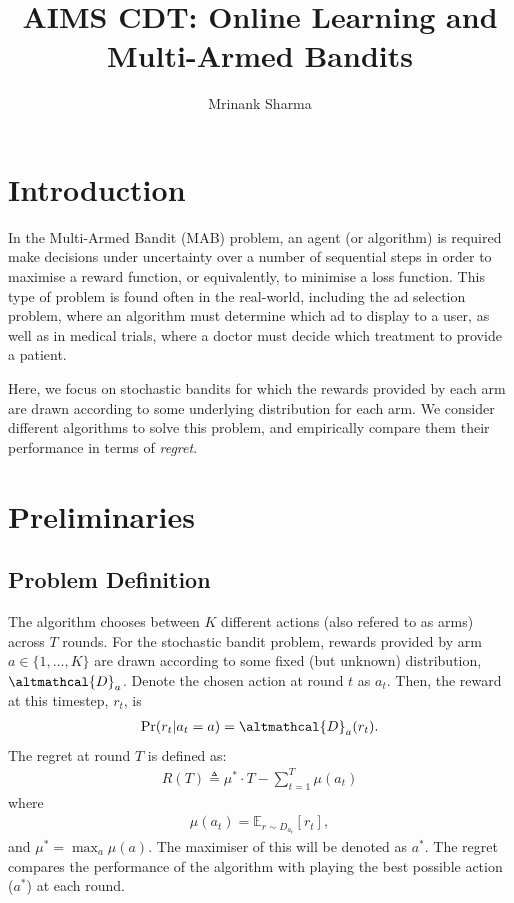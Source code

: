 \documentclass[a4paper]{article}
\title{\vspace{-3cm}AIMS CDT: Online Learning and Multi-Armed Bandits}
\author{Mrinank Sharma}
\date{}
\begin{document}
	\maketitle
	
	\section{Introduction}
	In the Multi-Armed Bandit (MAB) problem, an agent (or algorithm) is required make decisions under uncertainty over a number of sequential steps in order to maximise a reward function, or equivalently, to minimise a loss function. This type of problem is found often in the real-world, including the ad selection problem, where an algorithm must determine which ad to display to a user, as well as in medical trials, where a doctor must decide which treatment to provide a patient.
	
	Here, we focus on stochastic bandits for which the rewards provided by each arm are drawn according to some underlying distribution for each arm. We consider different algorithms to solve this problem, and empirically compare them their performance in terms of \emph{regret}. 
	
	\section{Preliminaries}
	\subsection{Problem Definition}
	The algorithm chooses between $K$ different actions (also refered to as arms) across $T$ rounds. For the stochastic bandit problem, rewards provided by arm $a \in  \lbrace 1, \ldots, K \rbrace$ are drawn according to some fixed (but unknown) distribution, $\altmathcal{D}_a$. Denote the chosen action at round $t$ as $a_t$. Then, the reward at this timestep, $r_t$, is
	\begin{align}
	\text{Pr}(r_t | a_t = a) = \altmathcal{D}_a(r_t).
	\end{align}
	The regret at round $T$ is defined as:
	\begin{align}
	R(T) \triangleq \mu^* \cdot T - \sum_{t=1}^{T} \mu(a_t)
	\end{align}
	where
	\begin{align}
	\mu(a_t) = \mathbb{E}_{r \sim D_{a_t}}[r_t],
	\end{align}
	and $\mu^* = \max_{a} \mu(a)$. The maximiser of this will be denoted as $a^*$. The regret compares the performance of the algorithm with playing the best possible action ($a^*$) at each round. 
	
\end{document}
